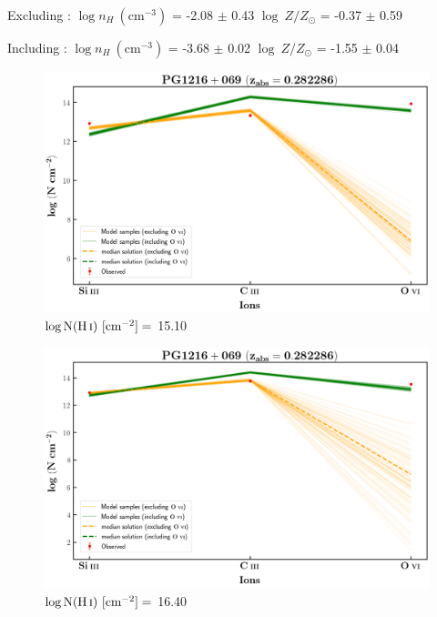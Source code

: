   Excluding  : $\log n_H \ (\text{cm}^{-3})$ = -2.08 $\pm$ 0.43 \hspace{10mm} $\log \ Z/Z_\odot$ = -0.37 $\pm$ 0.59
  
  Including  : $\log n_H \ (\text{cm}^{-3})$ = -3.68 $\pm$ 0.02 \hspace{10mm} $\log \ Z/Z_\odot$ = -1.55 $\pm$ 0.04 
  \newpage
  
  
  \begin{figure}[!h]
      \centering
      \includegraphics[width=0.85\linewidth]{Ionisation-Modelling-Plots/pg1216-z=0.282286-compI.png}
      \caption{$\log \text{N}(\ion{H}{i}) \ [\text{cm}^{-2}]=$ 15.10}
  \end{figure}
  
  \begin{figure}[!b]
      \centering
      \includegraphics[width=0.85\linewidth]{Ionisation-Modelling-Plots/pg1216-z=0.282286-compII.png}
      \caption{$\log \text{N}(\ion{H}{i}) \ [\text{cm}^{-2}]=$ 16.40}
  \end{figure}
  
  
  \newpage
  
